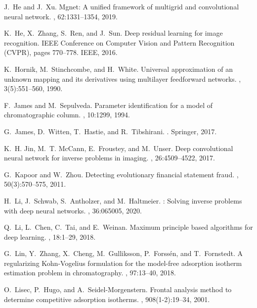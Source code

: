 \documentclass[thmsa,onecolumn,12pt]{article}%
\begin{document}
\begin{thebibliography}{99}
J.~He and J.~Xu.
\newblock Mgnet: A unified framework of multigrid and convolutional neural
  network.
, 62:1331--1354, 2019.

K.~He, X.~Zhang, S.~Ren, and J.~Sun.
\newblock Deep residual learning for image recognition.
 IEEE Conference on Computer Vision and Pattern Recognition
  (CVPR), pages 770--778. IEEE, 2016.

K.~Hornik, M.~Stinchcombe, and H.~White.
\newblock Universal approximation of an unknown mapping and its derivatives
  using multilayer feedforward networks.
, 3(5):551--560, 1990.

F.~James and M.~Sepulveda.
\newblock Parameter identification for a model of chromatographic column.
, 10:1299, 1994.

G.~James, D.~Witten, T.~Hastie, and R.~Tibshirani.
.
\newblock Springer, 2017.

K.~H. Jin, M.~T. McCann, E.~Froustey, and M.~Unser.
\newblock Deep convolutional neural network for inverse problems in imaging.
, 26:4509--4522, 2017.

G.~Kapoor and W.~Zhou.
\newblock Detecting evolutionary financial statement fraud.
, 50(3):570--575, 2011.

H.~Li, J.~Schwab, S.~Antholzer, and M.~Haltmeier.
: Solving inverse problems with deep neural networks.
, 36:065005, 2020.

Q.~Li, L.~Chen, C.~Tai, and E.~Weinan.
\newblock Maximum principle based algorithms for deep learning.
, 18:1--29, 2018.

G.~Lin, Y.~Zhang, X.~Cheng, M.~Gulliksson, P.~Forss{\'e}n, and T.~Fornstedt.
\newblock A regularizing {K}ohn-{V}ogelius formulation for the model-free
  adsorption isotherm estimation problem in chromatography.
, 97:13--40, 2018.

O.~Lisec, P.~Hugo, and A.~Seidel-Morgenstern.
\newblock Frontal analysis method to determine competitive adsorption
  isotherms.
, 908(1-2):19--34, 2001.


\end{thebibliography}
\end{document}
